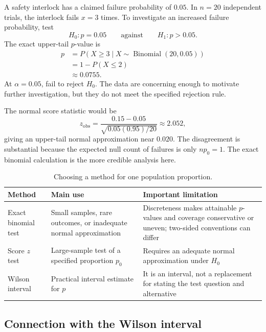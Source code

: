 \begin{example}\par
A safety interlock has a claimed failure probability of $0.05$. In $n=20$ independent trials, the interlock fails $x=3$ times. To investigate an increased failure probability, test
\[
H_0:p=0.05
\qquad\text{against}\qquad
H_1:p>0.05.
\]
The exact upper-tail $p$-value is
\[
\begin{aligned}
p
&=P(X\geq3\mid X\sim\operatorname{Binomial}(20,0.05))\\
&=1-P(X\leq2)\\
&\approx0.0755.
\end{aligned}
\]
At $\alpha=0.05$, fail to reject $H_0$. The data are concerning enough to motivate further investigation, but they do not meet the specified rejection rule.

The normal score statistic would be
\[
z_{\mathrm{obs}}
=\frac{0.15-0.05}{\sqrt{0.05(0.95)/20}}
\approx2.052,
\]
giving an upper-tail normal approximation near $0.020$. The disagreement is substantial because the expected null count of failures is only $np_0=1$. The exact binomial calculation is the more credible analysis here.
\end{example}

\begin{table}[htbp]
\centering
\caption{Choosing a method for one population proportion.}
\label{tab:one-proportion-methods}
\begin{tabularx}{\textwidth}{@{}l>{\raggedright\arraybackslash}X>{\raggedright\arraybackslash}X@{}}
\toprule
Method & Main use & Important limitation \\
\midrule
Exact binomial test & Small samples, rare outcomes, or inadequate normal approximation & Discreteness makes attainable $p$-values and coverage conservative or uneven; two-sided conventions can differ \\
Score $z$ test & Large-sample test of a specified proportion $p_0$ & Requires an adequate normal approximation under $H_0$ \\
Wilson interval & Practical interval estimate for $p$ & It is an interval, not a replacement for stating the test question and alternative \\
\bottomrule
\end{tabularx}
\end{table}

\subsection{Connection with the Wilson interval}

